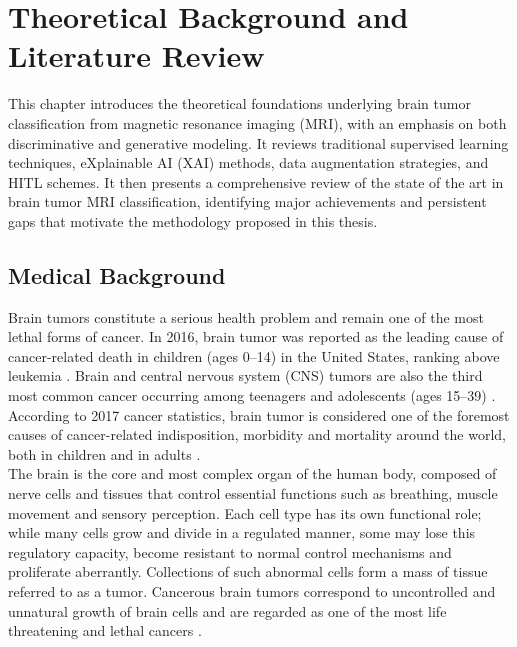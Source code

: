 \chapter{Theoretical Background and Literature Review}

This chapter introduces the theoretical foundations underlying brain tumor classification from magnetic resonance imaging (MRI), with an emphasis on both discriminative and generative modeling. It reviews traditional supervised learning techniques, eXplainable AI (XAI) methods, data augmentation strategies, and HITL schemes. It then presents a comprehensive review of the state of the art in brain tumor MRI classification, identifying major achievements and persistent gaps that motivate the methodology proposed in this thesis.


\section{Medical Background}

Brain tumors constitute a serious health problem and remain one of the most lethal forms of cancer. In 2016, brain tumor was reported as the leading cause of cancer-related death in children (ages 0--14) in the United States, ranking above leukemia \cite{abiwinanda}. Brain and central nervous system (CNS) tumors are also the third most common cancer occurring among teenagers and adolescents (ages 15--39) \cite{abiwinanda}. According to 2017 cancer statistics, brain tumor is considered one of the foremost causes of cancer-related indisposition, morbidity and mortality around the world, both in children and in adults \cite{Rehman2020}.\\

The brain is the core and most complex organ of the human body, composed of nerve cells and tissues that control essential functions such as breathing, muscle movement and sensory perception. Each cell type has its own functional role; while many cells grow and divide in a regulated manner, some may lose this regulatory capacity, become resistant to normal control mechanisms and proliferate aberrantly. Collections of such abnormal cells form a mass of tissue referred to as a tumor. Cancerous brain tumors correspond to uncontrolled and unnatural growth of brain cells and are regarded as one of the most life threatening and lethal cancers \cite{Rehman2020}.\\

